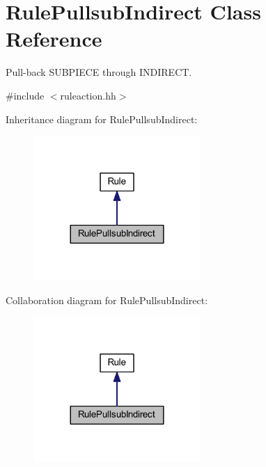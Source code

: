 \hypertarget{class_rule_pullsub_indirect}{}\section{Rule\+Pullsub\+Indirect Class Reference}
\label{class_rule_pullsub_indirect}


Pull-\/back S\+U\+B\+P\+I\+E\+CE through I\+N\+D\+I\+R\+E\+CT.  




{\ttfamily \#include $<$ruleaction.\+hh$>$}



Inheritance diagram for Rule\+Pullsub\+Indirect\+:
\nopagebreak
\begin{figure}[H]
\begin{center}
\leavevmode
\includegraphics[width=180pt]{class_rule_pullsub_indirect__inherit__graph}
\end{center}
\end{figure}


Collaboration diagram for Rule\+Pullsub\+Indirect\+:
\nopagebreak
\begin{figure}[H]
\begin{center}
\leavevmode
\includegraphics[width=180pt]{class_rule_pullsub_indirect__coll__graph}
\end{center}
\end{figure}

